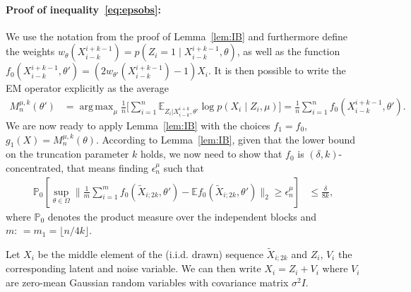 \documentclass[twoside,11pt]{article}
\newcommand{\numobs}{\ensuremath{n}}
\DeclareMathOperator*{\argmax}{arg\, max}
\def\EE{ \mathbb{E} }
\newcommand{\subsize}{\numobs} %
\newcommand{\subprob}{\delta}
\newcommand{\blocksize}{\ensuremath{m}}
\newcommand{\EEzcondx}[3]{\ensuremath{\EE_{#1|#2,#3}}}
\newcommand{\weightsingle}[2]{w_{#1}(#2)}
\newcommand{\epsilonobs}{\epsilon^\paramobs}
\newcommand{\paramobs}{\mu}
\newcommand{\paramobsone}{\ensuremath{\paramobs}}
\newcommand{\paramjoint}{\theta}
\newcommand{\paramjointtwo}{\paramjoint'}
\newcommand{\paramjointwo}{\paramjointtwo}
\newcommand{\emopsamptruncobs}[1]{\ensuremath{M_{\subsize}^{\paramobs,k}(#1)}}
\newcommand{\mprob}{\ensuremath{\mathbb{P}}}
\newcommand{\defn}{: \, = }
\newcommand{\DomTheta}{\ensuremath{\Omega}}
\newcommand{\kdim}{\ensuremath{k}}
\newcommand{\myparagraph}[1]{\paragraph{#1:}}
\newcommand{\Xtil}{\ensuremath{\widetilde{X}}}
\begin{document}



\myparagraph{Proof of inequality~\eqref{eq:epsobs}} We use the
notation from the proof of Lemma~\ref{lem:IB} and furthermore define
the weights $\weightsingle{\paramjoint}{X_{i-k}^{i+k-1}} = p(Z_i =1
\mid X_{i-k}^{i+k-1},\theta)$, as well as the function
\mbox{$f_0(X_{i-k}^{i+k-1}, \paramjoint') = (2
  \weightsingle{\paramjoint'}{X_{i-k}^{i+k-1}} - 1) X_i$.}  It is then
possible to write the EM operator explicitly as the
average
\begin{align*}
\emopsamptruncobs{\paramjoint'} & = \argmax_{\paramobs}
\frac{1}{\subsize} \Big[ \sum_{i=1}^{\subsize}
  \EEzcondx{Z_i}{X_{i-\kdim}^{i+\kdim}}{\paramjointwo} \log p(X_i \mid
  Z_i,\paramobsone) \Big] = \frac{1}{\numobs} \sum_{i=1}^{\subsize}
f_0 (X_{i-k}^{i+k-1}, \paramjoint').
\end{align*}
We are now ready to apply Lemma~\ref{lem:IB} with the choices $f_1 =
f_0$, $g_1(X) = \emopsamptruncobs{\paramjoint} $.  According to
Lemma~\ref{lem:IB}, given that the lower bound on the truncation
parameter $k$ holds, we now need to show that $f_0$ is
$(\subprob,\kdim)$-concentrated, that means finding
$\epsilonobs_{\numobs}$ such that
\begin{align*}
\mprob_0\left [ \sup_{\theta \in \DomTheta}\big\| \frac{1}{\blocksize}\sum_{i=1}^\blocksize
  f_0(\Xtil_{i;2k},\paramjoint') - \EE f_0(\Xtil_{i;2k},\paramjoint') \big\|_2 \geq
  \epsilonobs_{\numobs} \right] & \leq \frac{\subprob}{8 \kdim},
\end{align*}
where $\mprob_0$ denotes the product measure over the independent blocks
and $\blocksize \defn \blocksize_1 = \lfloor \subsize/ 4 \kdim \rfloor$.

Let $X_i$ be the middle element of the (i.i.d. drawn) sequence $\Xtil_{i;2k}$ and $Z_i$,
$V_i$ the corresponding latent and noise variable. We can then write
$X_i = Z_i + V_i$ where $V_i$ are zero-mean Gaussian random variables
with covariance matrix $\sigma^2 I$.
\end{document}
